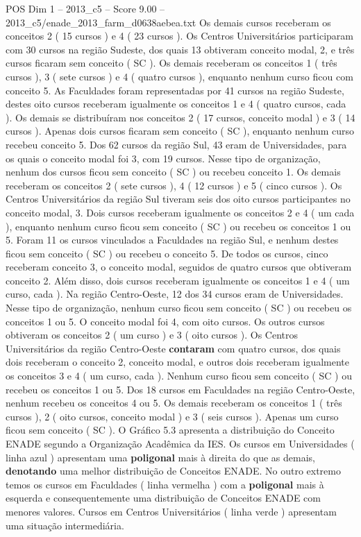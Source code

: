 \begin{textsample}{POS Dim 1 – 2013\_c5 – Score 9.00 – 2013\_c5/enade\_2013\_farm\_d0638aebea.txt}
Os demais cursos receberam os conceitos 2 ( 15 cursos ) e 4 ( 23 cursos ).
Os Centros Universitários participaram com 30 cursos na região Sudeste, dos quais 13 obtiveram conceito modal, 2, e três cursos ficaram sem conceito ( SC ).
Os demais receberam os conceitos 1 ( três cursos ), 3 ( sete cursos ) e 4 ( quatro cursos ), enquanto nenhum curso ficou com conceito 5.
As Faculdades foram representadas por 41 cursos na região Sudeste, destes oito cursos receberam igualmente os conceitos 1 e 4 ( quatro cursos, cada ).
Os demais se distribuíram nos conceitos 2 ( 17 cursos, conceito modal ) e 3 ( 14 cursos ).
Apenas dois cursos ficaram sem conceito ( SC ), enquanto nenhum curso recebeu conceito 5.
Dos 62 cursos da região Sul, 43 eram de Universidades, para os quais o conceito modal foi 3, com 19 cursos.
Nesse tipo de organização, nenhum dos cursos ficou sem conceito ( SC ) ou recebeu conceito 1.
Os demais receberam os conceitos 2 ( sete cursos ), 4 ( 12 cursos ) e 5 ( cinco cursos ).
Os Centros Universitários da região Sul tiveram seis dos oito cursos participantes no conceito modal, 3.
Dois cursos receberam igualmente os conceitos 2 e 4 ( um cada ), enquanto nenhum curso ficou sem conceito ( SC ) ou recebeu os conceitos 1 ou 5.
Foram 11 os cursos vinculados a Faculdades na região Sul, e nenhum destes ficou sem conceito ( SC ) ou recebeu o conceito 5.
De todos os cursos, cinco receberam conceito 3, o conceito modal, seguidos de quatro cursos que obtiveram conceito 2.
Além disso, dois cursos receberam igualmente os conceitos 1 e 4 ( um curso, cada ).
Na região Centro-Oeste, 12 dos 34 cursos eram de Universidades.
Nesse tipo de organização, nenhum curso ficou sem conceito ( SC ) ou recebeu os conceitos 1 ou 5.
O conceito modal foi 4, com oito cursos.
Os outros cursos obtiveram os conceitos 2 ( um curso ) e 3 ( oito cursos ).
Os Centros Universitários da região Centro-Oeste \textbf{contaram} com quatro cursos, dos quais dois receberam o conceito 2, conceito modal, e outros dois receberam igualmente os conceitos 3 e 4 ( um curso, cada ).
Nenhum curso ficou sem conceito ( SC ) ou recebeu os conceitos 1 ou 5.
Dos 18 cursos em Faculdades na região Centro-Oeste, nenhum recebeu os conceitos 4 ou 5.
Os demais receberam os conceitos 1 ( três cursos ), 2 ( oito cursos, conceito modal ) e 3 ( seis cursos ).
Apenas um curso ficou sem conceito ( SC ).
O Gráfico 5.3 apresenta a distribuição do Conceito ENADE segundo a Organização Acadêmica da IES.
Os cursos em Universidades ( linha azul ) apresentam uma \textbf{poligonal} mais à direita do que as demais, \textbf{denotando} uma melhor distribuição de Conceitos ENADE.
No outro extremo temos os cursos em Faculdades ( linha vermelha ) com a \textbf{poligonal} mais à esquerda e consequentemente uma distribuição de Conceitos ENADE com menores valores.
Cursos em Centros Universitários ( linha verde ) apresentam uma situação intermediária.

\end{textsample}
